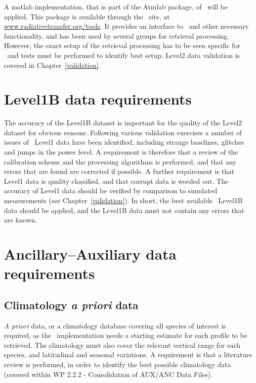A matlab implementation, that is part of the Atmlab package, 
of \OEM\ will be applied. This package is available through the \ARTS\ site,
at \url{www.radiativetransfer.org/tools}. It provides an interface
to \ARTS\ and other necessary functionality, and has
been used by several groups for retrieval processing.
However, the exact setup of the retrieval processing
has to be seen specific for \smr\ and tests must be performed
to identify best setup. Level2 data validation 
is covered in Chapter~\ref{validation}.


\section{Level1B data requirements}

The accuracy of the Level1B dataset is important for the quality of the
Level2 dataset for obvious reasons. 
Following various validation exercises a number of 
issues of \smr\ Level1 data have been identified, 
including strange baselines, glitches and jumps in the power level.
A requirement is therefore that a review of the calibration 
scheme and the processing algorithms is performed,
and that any errors that are found are corrected if possible.
A further requirement is that Level1 data is quality classified, 
and that corrupt data is weeded out.
The accuracy of Level1 data should be verified by comparison
to simulated measurements (see Chapter~\ref{validation}).
In short,
the best available \smr\ Level1B data should be applied,
and the Level1B data must not contain any errors that are known.


\section{Ancillary--Auxiliary data requirements}
\subsection{Climatology \textit{a priori} data}
\textit{A priori} data, or a climatology database covering all species of interest
is required, as the \OEM\ implementation needs a starting estimate for each profile
to be retrieved. 
The climatology must also cover the relevant vertical range for each species, and
latitudinal and seasonal variations.
A requirement is that a literature review is performed,
in order to identify the best possible climatology data
(covered within WP 2.2.2 - Consolidation of AUX/ANC Data Files).


